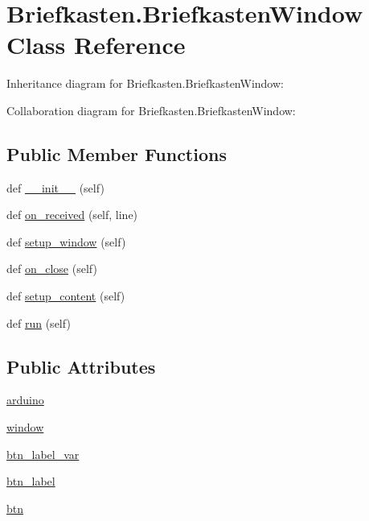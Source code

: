 \hypertarget{class_briefkasten_1_1_briefkasten_window}{}\section{Briefkasten.\+Briefkasten\+Window Class Reference}
\label{class_briefkasten_1_1_briefkasten_window}


Inheritance diagram for Briefkasten.\+Briefkasten\+Window\+:


Collaboration diagram for Briefkasten.\+Briefkasten\+Window\+:
\subsection*{Public Member Functions}
\begin{DoxyCompactItemize}
\item 
def \mbox{\hyperlink{class_briefkasten_1_1_briefkasten_window_a099c7a5ddfaeacce0c6f802e23f410b7}{\+\_\+\+\_\+init\+\_\+\+\_\+}} (self)
\item 
def \mbox{\hyperlink{class_briefkasten_1_1_briefkasten_window_ac28e1330886bcc69951657af3a81d75d}{on\+\_\+received}} (self, line)
\item 
def \mbox{\hyperlink{class_briefkasten_1_1_briefkasten_window_aee85e8964104d0b0e06cda63d386b367}{setup\+\_\+window}} (self)
\item 
def \mbox{\hyperlink{class_briefkasten_1_1_briefkasten_window_a83fb0ba832ecfa92c5ae81a28ac7f684}{on\+\_\+close}} (self)
\item 
def \mbox{\hyperlink{class_briefkasten_1_1_briefkasten_window_a2d9601bba3e90b89c60f914508f4f796}{setup\+\_\+content}} (self)
\item 
def \mbox{\hyperlink{class_briefkasten_1_1_briefkasten_window_a4b395d7a25d0202d3cd1f97fe2318e56}{run}} (self)
\end{DoxyCompactItemize}
\subsection*{Public Attributes}
\begin{DoxyCompactItemize}
\item 
\mbox{\hyperlink{class_briefkasten_1_1_briefkasten_window_ad61bca445900cbd6887c8d31251c867a}{arduino}}
\item 
\mbox{\hyperlink{class_briefkasten_1_1_briefkasten_window_ab2d79f6a0980a7ee8de326178f5d4b6a}{window}}
\item 
\mbox{\hyperlink{class_briefkasten_1_1_briefkasten_window_a4575f63074ec0c6ca7bcf3c32490ff9e}{btn\+\_\+label\+\_\+var}}
\item 
\mbox{\hyperlink{class_briefkasten_1_1_briefkasten_window_a1a7a8143c42806f62fc4480e43f10410}{btn\+\_\+label}}
\item 
\mbox{\hyperlink{class_briefkasten_1_1_briefkasten_window_aeadd228e296b44fee4814b674557e865}{btn}}
\end{DoxyCompactItemize}


